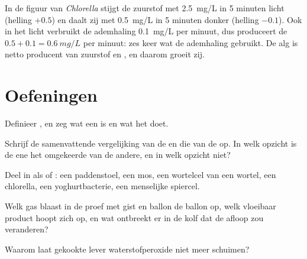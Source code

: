 \begin{example}\label{ex:g10:cell-metabolism:truerate}
In de figuur van \emph{Chlorella} stijgt de zuurstof met \qty{2.5}{mg/L}
in 5 minuten licht (helling $+0.5$) en daalt zij met \qty{0.5}{mg/L} in
5 minuten donker (helling $-0.1$). Ook in het licht verbruikt de
ademhaling \qty{0.1}{mg/L} per minuut, dus produceert de 
$0.5 + 0.1 = \qty{0.6}{mg/L}$ per minuut: zes keer wat de ademhaling
gebruikt. De alg is netto producent van zuurstof en , en
daarom groeit zij.
\end{example}

\section{Oefeningen}

\begin{exercise}[$\star$]\label{exo:g10:cell-metabolism:1}
Definieer , en zeg wat een  is en wat het doet.
\end{exercise}

\begin{exercise}[$\star$]\label{exo:g10:cell-metabolism:2}
Schrijf de samenvattende vergelijking van de  en die van de
 op. In welk opzicht is de ene het omgekeerde van de andere,
en in welk opzicht niet?
\end{exercise}

\begin{exercise}[$\star$]\label{exo:g10:cell-metabolism:3}
Deel in als  of : een paddenstoel, een mos, een
wortelcel van een wortel, een chlorella, een yoghurtbacterie, een
menselijke spiercel.
\end{exercise}

\begin{exercise}[$\star$]\label{exo:g10:cell-metabolism:4}
Welk gas blaast in de proef met gist en ballon de ballon op, welk
vloeibaar product hoopt zich op, en wat ontbreekt er in de kolf dat de
afloop zou veranderen?
\end{exercise}

\begin{exercise}[$\star$]\label{exo:g10:cell-metabolism:5}
Waarom laat gekookte lever waterstofperoxide niet meer schuimen?
\end{exercise}

